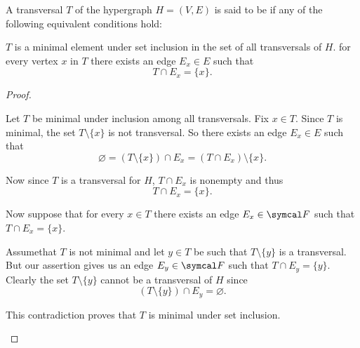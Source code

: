 \begin{definition}\label{def:minimal_hypergraph_transversal}
  A transversal \( T \) of the hypergraph \( H = (V, E) \) is said to be  if any of the following equivalent conditions hold:
  \begin{defenum}
     \( T \) is a minimal element under set inclusion in the set of all transversals of \( H \).
     for every vertex \( x \) in \( T \) there exists an edge \( E_x \in E \) such that
    \begin{equation*}
      T \cap E_x = \{ x \}.
    \end{equation*}
  \end{defenum}
\end{definition}
\begin{proof}
  \begin{description}
     Let \( T \) be minimal under inclusion among all transversals. Fix \( x \in T \). Since \( T \) is minimal, the set \( T \setminus \{ x \} \) is not transversal. So there exists an edge \( E_x \in E \) such that
    \begin{equation*}
      \varnothing = (T \setminus \{ x \}) \cap E_x = (T \cap E_x) \setminus \{ x \}.
    \end{equation*}

    Now since \( T \) is a transversal for \( H \), \( T \cap E_x \) is nonempty and thus
    \begin{equation*}
      T \cap E_x = \{ x \}.
    \end{equation*}

     Now suppose that for every \( x \in T \) there exists an edge \( E_x \in \Cal{F} \) such that \( T \cap E_x = \{ x \} \).

    Assume\LEM that \( T \) is not minimal and let \( y \in T \) be such that \( T \setminus \{ y \} \) is a transversal. But our assertion gives us an edge \( E_y \in \Cal{F} \) such that \( T \cap E_y = \{ y \} \). Clearly the set \( T \setminus \{ y \} \) cannot be a transversal of \( H \) since
    \begin{equation*}
      (T \setminus \{ y \}) \cap E_y = \varnothing.
    \end{equation*}

    This contradiction proves that \( T \) is minimal under set inclusion.
  \end{description}
\end{proof}

